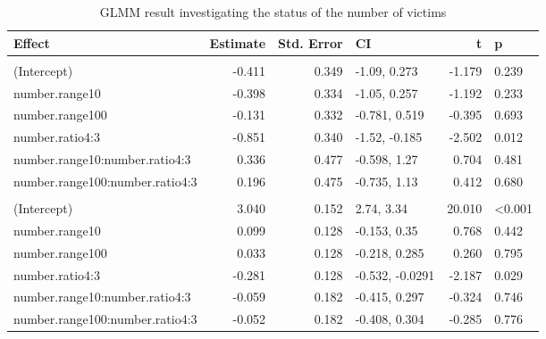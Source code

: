 \documentclass[
]{article}
\begin{document}
\begin{table}
\centering
\caption{\label{tab:n-victims-glmer-print}GLMM result investigating the status of the number of victims}
\centering
\begin{tabular}[t]{lrrlrl}
\toprule
Effect & Estimate & Std. Error & CI & t & p\\
\midrule
\addlinespace[0.3em]
\multicolumn{6}{l}{\textbf{binary ratings}}\\
\hspace{1em}(Intercept) & -0.411 & 0.349 & -1.09, 0.273 & -1.179 & 0.239\\
\hspace{1em}number.range10 & -0.398 & 0.334 & -1.05, 0.257 & -1.192 & 0.233\\
\hspace{1em}number.range100 & -0.131 & 0.332 & -0.781, 0.519 & -0.395 & 0.693\\
\hspace{1em}number.ratio4:3 & -0.851 & 0.340 & -1.52, -0.185 & -2.502 & 0.012\\
\hspace{1em}number.range10:number.ratio4:3 & 0.336 & 0.477 & -0.598, 1.27 & 0.704 & 0.481\\
\hspace{1em}number.range100:number.ratio4:3 & 0.196 & 0.475 & -0.735, 1.13 & 0.412 & 0.680\\
\addlinespace[0.3em]
\multicolumn{6}{l}{\textbf{raw ratings}}\\
\hspace{1em}(Intercept) & 3.040 & 0.152 & 2.74, 3.34 & 20.010 & <0.001\\
\hspace{1em}number.range10 & 0.099 & 0.128 & -0.153, 0.35 & 0.768 & 0.442\\
\hspace{1em}number.range100 & 0.033 & 0.128 & -0.218, 0.285 & 0.260 & 0.795\\
\hspace{1em}number.ratio4:3 & -0.281 & 0.128 & -0.532, -0.0291 & -2.187 & 0.029\\
\hspace{1em}number.range10:number.ratio4:3 & -0.059 & 0.182 & -0.415, 0.297 & -0.324 & 0.746\\
\hspace{1em}number.range100:number.ratio4:3 & -0.052 & 0.182 & -0.408, 0.304 & -0.285 & 0.776\\
\bottomrule
\end{tabular}
\end{table}
\end{document}
